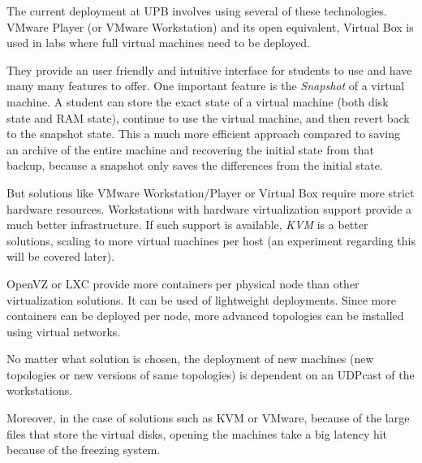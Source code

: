 The current deployment at UPB involves using several of these
technologies. VMware Player (or VMware Workstation) and its open
equivalent, Virtual Box is used in labs where full virtual machines need
to be deployed.

They provide an user friendly and intuitive interface
for students to use and have many many features to offer. One important
feature is the \emph{Snapshot} of a virtual machine. A student can store
the exact state of a virtual machine (both disk state and RAM state),
continue to use the virtual machine, and then revert back to the
snapshot state. This a much more efficient approach compared to saving
an archive of the entire machine and recovering the initial state from
that backup, because a snapshot only saves the differences from the
initial state.

But solutions like VMware Workstation/Player or Virtual Box require
more strict hardware resources. Workstations with hardware
virtualization support provide a much better infrastructure. If such
support is available, \emph{\ac{KVM}} is a better solutions, scaling
to more virtual machines per host (an experiment regarding this will be
covered later).

OpenVZ or LXC provide more containers per physical node than other
virtualization solutions. It can be used of lightweight deployments.
Since more containers can be deployed per node, more advanced topologies
can be installed using virtual networks.

No matter what solution is chosen, the deployment of new machines (new
topologies or new versions of same topologies) is dependent on an
UDPcast of the workstations.

Moreover, in the case of solutions such as KVM or VMware, because of the
large files that store the virtual disks, opening the machines take a
big latency hit because of the freezing system.
